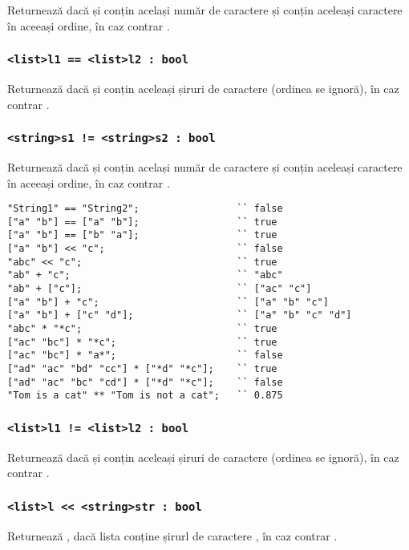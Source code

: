 Returnează \true{} dacă  și  conțin același număr de caractere și conțin aceleași caractere în aceeași ordine, în caz contrar \false{}.

\subsubsection{\lstinline|<list>l1 == <list>l2 : bool|}

Returnează \true{} dacă  și  conțin aceleași șiruri de caractere (ordinea se ignoră), în caz contrar \false{}.

\subsubsection{\lstinline|<string>s1 != <string>s2 : bool|}

Returnează \false{} dacă  și  conțin același număr de caractere și conțin aceleași caractere în aceeași ordine, în caz contrar \true{}.

\begin{lstlisting}[caption=Exemple de folosire al operatorilor asupra tipului string și list, label=stringlistopex]
"String1" == "String2";					`` false
["a" "b"] == ["a" "b"];					`` true
["a" "b"] == ["b" "a"];					`` true
["a" "b"] << "c";						`` false
"abc" << "c";							`` true
"ab" + "c";								`` "abc"
"ab" + ["c"];							`` ["ac" "c"]
["a" "b"] + "c";						`` ["a" "b" "c"]
["a" "b"] + ["c" "d"];					`` ["a" "b" "c" "d"]
"abc" * "*c";							`` true
["ac" "bc"] * "*c";						`` true
["ac" "bc"] * "a*";						`` false
["ad" "ac" "bd" "cc"] * ["*d" "*c"];	`` true
["ad" "ac" "bc" "cd"] * ["*d" "*c"];	`` false
"Tom is a cat" ** "Tom is not a cat";	`` 0.875
\end{lstlisting}

\subsubsection{\lstinline|<list>l1 != <list>l2 : bool|}

Returnează \false{} dacă  și  conțin aceleași șiruri de caractere (ordinea se ignoră), în caz contrar \true{}.

\subsubsection{\lstinline|<list>l << <string>str : bool|}

Returnează \true{}, dacă lista  conține șirurl de caractere , în caz contrar \false{}.

